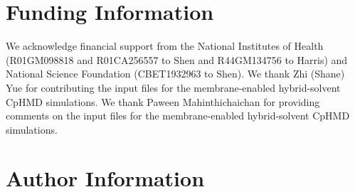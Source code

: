 \documentclass[9pt,tutorial]{livecoms}
\begin{document}
\section{Funding Information}
We acknowledge financial support from the National Institutes of Health (R01GM098818 and R01CA256557 to Shen and R44GM134756 to Harris) and National Science Foundation (CBET1932963 to Shen). 
We thank Zhi (Shane) Yue for contributing the input files for the membrane-enabled hybrid-solvent CpHMD simulations.
We thank Paween Mahinthichaichan for providing comments on the input files for the membrane-enabled hybrid-solvent CpHMD simulations.


\section*{Author Information}
\makeorcid




\end{document}
